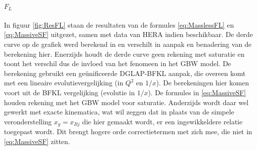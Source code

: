 \documentclass[a4paper,11pt]{article}
\numberwithin{equation}{section} %
\begin{document}
      \paragraph{$F_L$}
In figuur \ref{fig:ResFL} staan de resultaten van de formules \eqref{eq:MasslessFL} en \eqref{eq:MassiveSF} uitgezet, samen met data van HERA \cite{H1} \cite{ZEUS} indien beschikbaar.
De derde curve op de grafiek werd berekend in \cite{Stasto} en verschilt in aanpak en benadering van de berekening hier.
Enerzijds houdt de derde curve geen rekening met saturatie en toont het verschil dus de invloed van het fenomeen in het GBW model.
De berekening gebruikt een geünificeerde DGLAP-BFKL aanpak, die overeen komt met een lineaire evolutievergelijking (in $Q^2$ en $1/x$).
De berekeningen hier komen voort uit de BFKL vergelijking (evolutie in $1/x$).
De formules in \eqref{eq:MassiveSF} houden rekening met het GBW model voor saturatie.
Anderzijds wordt daar wel gewerkt met exacte kinematica, wat wil zeggen dat in plaats van de simpele veronderstelling $x_g=x_{Bj}$ die hier gemaakt wordt, er een ingewikkeldere relatie toegepast wordt.
Dit brengt hogere orde correctietermen met zich mee, die niet in \eqref{eq:MassiveSF} zitten.
\end{document}
